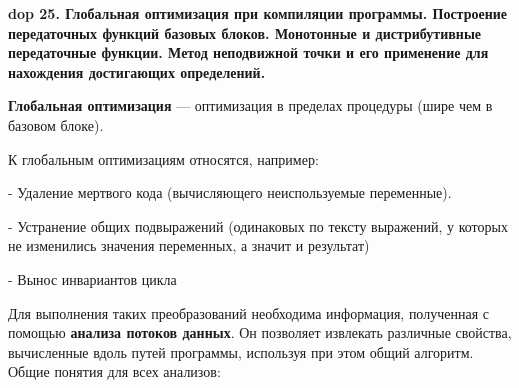 \textbf{\LARGE dop 25. Глобальная оптимизация при компиляции программы. Построение передаточных функций базовых блоков. Монотонные и дистрибутивные передаточные функции. Метод неподвижной точки и его применение для нахождения достигающих определений.}

\textbf{Глобальная оптимизация} --- оптимизация в пределах процедуры (шире чем в базовом блоке).

К глобальным оптимизациям относятся, например:

- Удаление мертвого кода (вычисляющего неиспользуемые переменные).

- Устранение общих подвыражений (одинаковых по тексту выражений, у которых не изменились значения переменных, а значит и результат)

- Вынос инвариантов цикла


Для выполнения таких преобразований необходима информация, полученная с помощью \textbf{анализа потоков данных}. Он позволяет извлекать различные свойства, вычисленные вдоль путей программы, используя при этом общий алгоритм. Общие понятия для всех анализов:

